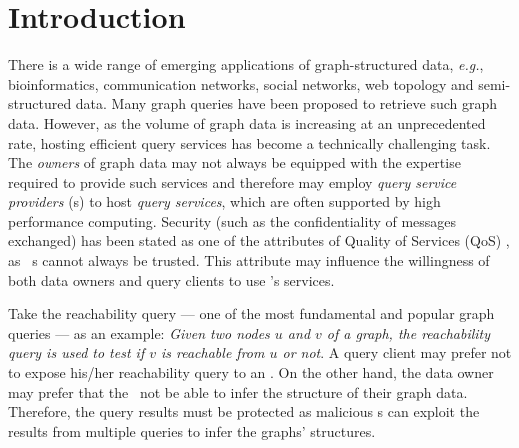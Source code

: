 \section{Introduction}
\label{sec:intro}


There is a wide range of emerging applications of
graph-structured data, {\it e.g.}, bioinformatics, communication
networks, social networks, web topology and semi-structured data. Many graph queries have been proposed to retrieve such graph
data.
However, as the volume of graph data is increasing at an unprecedented rate,
hosting efficient query services has become a technically challenging task.  The
{\em owners} of graph data may not always be equipped with the expertise
required to provide such services and therefore may
employ {\em query service providers} (\SP s) to host {\em query services}, which
are often supported by high performance computing. Security (such as
the confidentiality of messages exchanged) has been stated as one of the
attributes of Quality of Services (QoS) \cite{issues}, as \SP\ s cannot always be
trusted. This attribute may influence the willingness of both data owners and query clients to use \SP's services.


Take the reachability query ---  one of the most fundamental and popular graph queries
\cite{cohen, ferrari, sigmod2012, grail, gripp, 3hop, pathhop, hopi, chengjf1,
chengjf2, byron, cikmlabel, bitcompression, pathtree} --- as an example:  {\em
Given two nodes $u$ and $v$ of a graph, the reachability query is used to test if $v$
is reachable from $u$ or not}.
A query client may prefer not to expose his/her reachability query to an \SP.
On the other hand, the data owner may prefer that the \SP\ not be able to infer
the structure of their graph data. Therefore, the query results must be
protected as malicious \SP s can exploit the results from multiple queries to
infer the graphs' structures.



